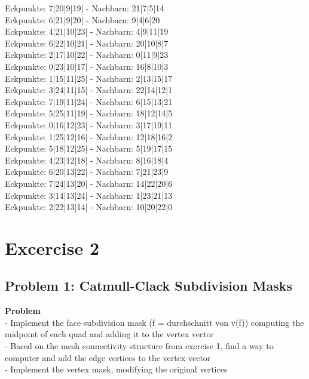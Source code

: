 \documentclass[12pt,a4paper]{scrartcl}
\begin{document}
Eckpunkte: 7|20|9|19| - Nachbarn: 21|7|5|14\\
Eckpunkte: 6|21|9|20| - Nachbarn: 9|4|6|20\\
Eckpunkte: 4|21|10|23| - Nachbarn: 4|9|11|19\\
Eckpunkte: 6|22|10|21| - Nachbarn: 20|10|8|7\\
Eckpunkte: 2|17|10|22| - Nachbarn: 0|11|9|23\\
Eckpunkte: 0|23|10|17| - Nachbarn: 16|8|10|3\\
Eckpunkte: 1|15|11|25| - Nachbarn: 2|13|15|17\\
Eckpunkte: 3|24|11|15| - Nachbarn: 22|14|12|1\\
Eckpunkte: 7|19|11|24| - Nachbarn: 6|15|13|21\\
Eckpunkte: 5|25|11|19| - Nachbarn: 18|12|14|5\\
Eckpunkte: 0|16|12|23| - Nachbarn: 3|17|19|11\\
Eckpunkte: 1|25|12|16| - Nachbarn: 12|18|16|2\\
Eckpunkte: 5|18|12|25| - Nachbarn: 5|19|17|15\\
Eckpunkte: 4|23|12|18| - Nachbarn: 8|16|18|4\\
Eckpunkte: 6|20|13|22| - Nachbarn: 7|21|23|9\\
Eckpunkte: 7|24|13|20| - Nachbarn: 14|22|20|6\\
Eckpunkte: 3|14|13|24| - Nachbarn: 1|23|21|13\\
Eckpunkte: 2|22|13|14| - Nachbarn: 10|20|22|0\\

\newpage

\section{Excercise 2}

\subsection{Problem 1: Catmull-Clack Subdivision Masks}

\large
\textbf{Problem}\\
- Implement the face subdivision mask (f = durchschnitt von v(f)) computing the midpoint of each quad and adding it to the vertex vector\\
- Based on the mesh connectivity structure from exercise 1, find a way to computer and add the edge vertices to the vertex vector\\
- Implement the vertex mask, modifying the original vertices\\
 
\end{document}
